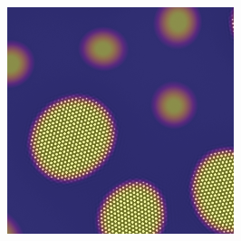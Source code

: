 \documentclass[showkeys, prb, reprint]{revtex4-1}
\begin{document}
\begin{figure}
\begin{subfigure}[b]{0.3\columnwidth}
        \label{fig:nucleation_and_growth}
        \caption{} 
    \end{subfigure}
    ~
    \begin{subfigure}[b]{0.3\columnwidth}
        \includegraphics[width=\textwidth]{sacrificalgrowth}
        \label{fig:sacrifical_growth}
        \caption{}
    \end{subfigure}
    

\end{figure}
\end{document}
